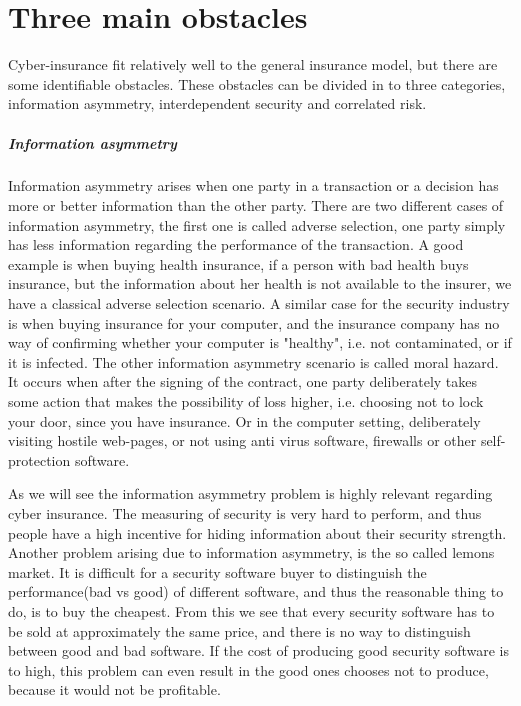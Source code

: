 \section{Three main obstacles}
Cyber-insurance fit relatively well to the general insurance model, but there are some identifiable obstacles. These obstacles can be divided in to three categories, information asymmetry, interdependent security and  correlated risk. 
\subparagraph{Information asymmetry}
Information asymmetry arises when one party in a transaction or a decision has more or better
 information than the other party. There are two different cases of information asymmetry, the first
  one is called adverse selection, one party simply has less information regarding the performance of
   the transaction. A good example is when buying health insurance, if a person with bad health buys
    insurance, but the information about her health is not available to the insurer, we have a
     classical adverse selection scenario. A similar case for the security industry is when buying
      insurance for your computer, and the insurance company has no way of confirming whether your
       computer is "healthy", i.e. not contaminated, or if it is infected. 
The other information asymmetry scenario is called moral hazard. It occurs when after the signing of
 the contract, one party deliberately takes some action that makes the possibility of loss higher,
  i.e. choosing not to lock your door, since you have insurance. Or in the computer setting,
   deliberately visiting hostile web-pages, or not using anti virus software, firewalls or other self-protection software.
    \cite{solutiontoinfoasym}
    
As we will see the information asymmetry problem is highly relevant regarding cyber insurance.
 The measuring of security is very hard to perform, and thus people have a 
 high incentive for hiding information about their security strength. 
 Another problem arising due to information asymmetry, 
 is the so called lemons market. It is difficult for a security software buyer to distinguish the
  performance(bad vs good) of different software, and thus the reasonable thing to do, is to buy the
   cheapest. From this we see that every security software has to be sold at approximately the same
    price, and there is no way to distinguish between good and bad software. If the cost of producing
     good security software is to high, this problem can even result in the good ones chooses not to
      produce, because it would not be profitable. 
      

